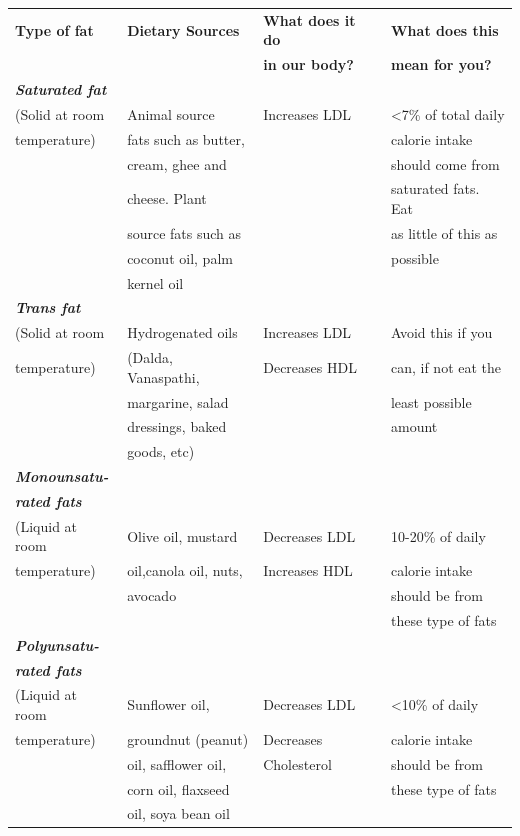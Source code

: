 \begin{longtable}{|l|l|l|l|}
\hline
\textbf{Type of fat} & \textbf{Dietary Sources} & \textbf{What does it do} & \textbf{What does this}\\
 &  & \textbf{in our body?} & \textbf{mean for you?}\\
\hline
\textbf\textit{Saturated fat} &  &  & \\
(Solid at room & Animal source & Increases LDL & \textless 7\% of total daily\\
temperature) & fats such as butter, &  & calorie intake\\
 & cream, ghee and &  & should come from\\
 & cheese. Plant &  & saturated fats. Eat\\
 & source fats such as &  & as little of this as\\
 & coconut oil, palm &  & possible\\
 & kernel oil &  & \\
\hline
\textbf\textit{Trans fat} &  &  & \\
(Solid at room & Hydrogenated oils & Increases LDL & Avoid this if you\\
temperature) & (Dalda, Vanaspathi, & Decreases HDL & can, if not eat the\\
 & margarine, salad &  & least possible\\
 & dressings, baked &  & amount\\
 & goods, etc) &  & \\
\hline
\textbf\textit{Monounsatu-} &  &  & \\
\textbf\textit{rated fats} &  &  & \\
(Liquid at room & Olive oil, mustard & Decreases LDL & 10-20\% of daily\\
temperature) & oil,canola oil, nuts, & Increases HDL & calorie intake\\
 & avocado &  & should be from\\
 &  &  & these type of fats\\
\hline
\textbf\textit{Polyunsatu-} &  &  & \\
\textbf\textit{rated fats} &  &  & \\
(Liquid at room & Sunflower oil, & Decreases LDL & \textless 10\% of daily\\
temperature) & groundnut (peanut) & Decreases & calorie intake\\
 & oil, safflower oil, & Cholesterol & should be from\\
 & corn oil, flaxseed &  & these type of fats\\
 & oil, soya bean oil &  & \\
 \hline
\end{longtable}

